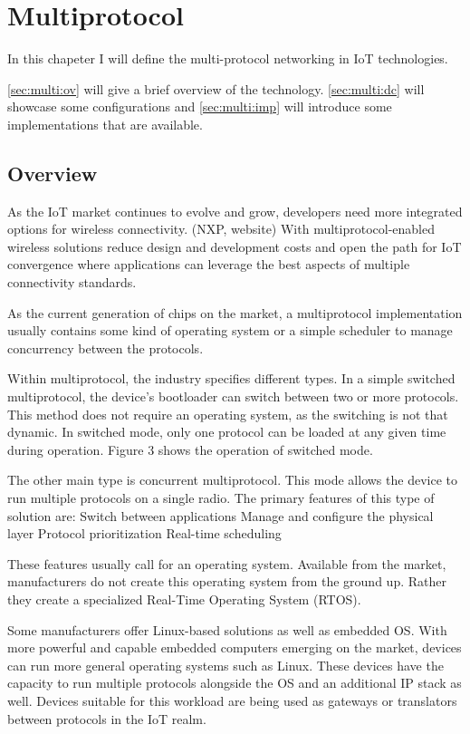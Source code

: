 \chapter{Multiprotocol}
\label{chap:multiprot}
In this chapeter I will define the multi-protocol networking in IoT technologies.

\autoref{sec:multi:ov} will give a brief overview of the technology.
\autoref{sec:multi:dc} will showcase some configurations and \autoref{sec:multi:imp} will introduce some implementations that are available.

\section{Overview}
\label{sec:multi:ov}
As the IoT market continues to evolve and grow, developers need more integrated options for wireless connectivity. (NXP, website) With multiprotocol-enabled wireless solutions reduce design and development costs and open the path for IoT convergence where applications can leverage the best aspects of multiple connectivity standards.

As the current generation of chips on the market, a multiprotocol implementation usually contains some kind of operating system or a simple scheduler to manage concurrency between the protocols.

Within multiprotocol, the industry specifies different types. In a simple switched multiprotocol, the device's bootloader can switch between two or more protocols. This method does not require an operating system, as the switching is not that dynamic. In switched mode, only one protocol can be loaded at any given time during operation. Figure 3 shows the operation of switched mode.

The other main type is concurrent multiprotocol. This mode allows the device to run multiple protocols on a single radio. The primary features of this type of solution are:
Switch between applications
Manage and configure the physical layer
Protocol prioritization
Real-time scheduling

These features usually call for an operating system. Available from the market, manufacturers do not create this operating system from the ground up. Rather they create a specialized Real-Time Operating System (RTOS).

Some manufacturers offer Linux-based solutions as well as embedded OS. With more powerful and capable embedded computers emerging on the market, devices can run more general operating systems such as Linux. These devices have the capacity to run multiple protocols alongside the OS and an additional IP stack as well. Devices suitable for this workload are being used as gateways or translators between protocols in the IoT realm.

